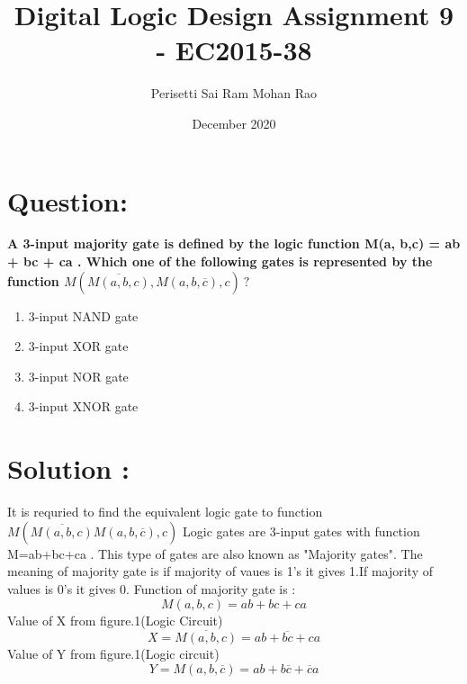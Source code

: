 \documentclass{article}
\title{Digital Logic Design Assignment 9 - EC2015-38}
\author{Perisetti Sai Ram Mohan Rao}
\date{December 2020}
\begin{document}
\maketitle

\section{Question:}

\textbf{A 3-input majority gate is defined by the logic
function M(a, b,c) = ab + bc + ca . Which one of the
following gates is represented by the function
$M(\overline{M(a,b,c)},M(a,b,\overline{c}),c) \ ?$}


\begin{enumerate}[label=(\Alph*)]
\item 3-input NAND gate
\item 3-input XOR gate 
\item 3-input NOR gate
\item 3-input XNOR gate
\end{enumerate}

\section{Solution :}                
 
It is requried to find the  equivalent logic gate to function $M(\overline{M(a,b,c)} M(a,b,\overline{c}),c)$ 
\newline
\newline
Logic gates are 3-input gates with function M=ab+bc+ca .
\newline
\newline
This type of gates are also known as "Majority gates".
\newline
\newline
The meaning of majority gate is if majority of vaues is 1's it gives 1.If majority of values is 0's it gives 0.
\newline Function of majority gate is :
\begin{equation}
    M(a,b,c)=ab+bc+ca
\end{equation}
Value of X from figure.1(Logic Circuit)
\begin{equation}
    X=\overline{M(a,b,c)}=\overline{ab+bc+ca}  
\end{equation}
Value of Y from figure.1(Logic circuit)
\begin{equation}
    Y=M(a,b,\overline{c})=ab+b\overline{c}+\overline{c}a
\end{equation}
\end{document}
